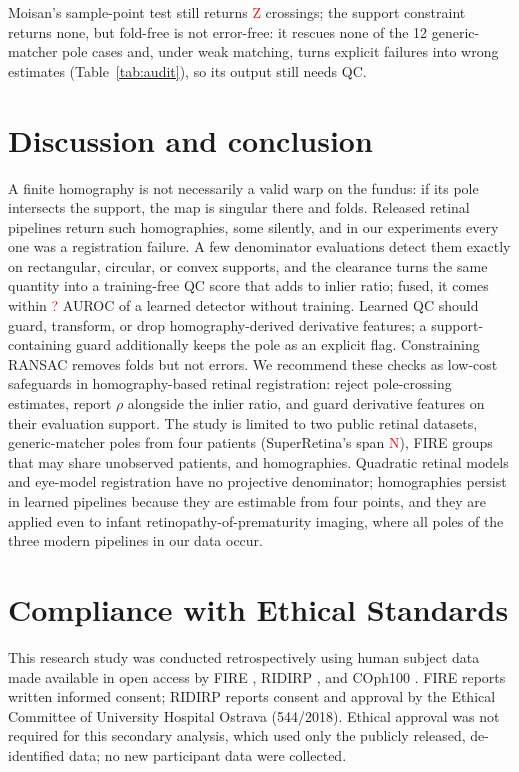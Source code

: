 \documentclass{article}
\newcommand{\pend}[1]{\textcolor{red}{#1}\typeout{PENDING VALUE: #1}}
\providecommand{\numMoisanLeft}{\pend{Z}}
\providecommand{\numSrPoleGroups}{\pend{N}}
\providecommand{\numFusedDetMargin}{\pend{?}}
\newcommand{\sr}{SuperRetina}
\begin{document}
Moisan's sample-point test \cite{moisan} still returns \numMoisanLeft{}
crossings; the support constraint returns none, but fold-free is not
error-free: it rescues none of the 12 generic-matcher pole cases and, under
weak matching, turns explicit failures into wrong estimates
(Table~\ref{tab:audit}), so its output still needs QC.

\section{Discussion and conclusion}
\label{sec:conclusion}

A finite homography is not necessarily a valid warp on the fundus: if its
pole intersects the support, the map is singular there and folds. Released
retinal pipelines return such homographies, some silently, and in our
experiments every one was a registration failure. A few denominator
evaluations detect them exactly on rectangular, circular, or convex supports,
and the clearance turns the same quantity into a training-free QC score that
adds to inlier ratio; fused, it comes within \numFusedDetMargin{} AUROC of a
learned detector without training. Learned QC should guard, transform, or
drop homography-derived derivative features; a support-containing guard
additionally keeps the pole as an explicit flag. Constraining RANSAC removes
folds but not errors. We recommend these checks as low-cost safeguards in
homography-based retinal registration: reject pole-crossing estimates, report
$\rho$ alongside the inlier ratio, and guard derivative features on their
evaluation support. The study is limited to two
public retinal datasets, generic-matcher poles from four patients
(\sr{}'s span \numSrPoleGroups), FIRE groups that may share unobserved
patients, and homographies. Quadratic retinal models \cite{can,gdbicp} and
eye-model registration \cite{rempe} have no projective denominator;
homographies persist in learned pipelines because they are estimable from
four points, and they are applied even to infant retinopathy-of-prematurity
imaging, where all poles of the three modern pipelines in our data occur.

\section{Compliance with Ethical Standards}
\label{sec:ethics}

This research study was conducted retrospectively using human subject data
made available in open access by FIRE \cite{fire}, RIDIRP \cite{ridirp}, and
COph100 \cite{coph}. FIRE reports written informed consent; RIDIRP reports
consent and approval by the Ethical Committee of University Hospital Ostrava
(544/2018). Ethical approval was not required for this secondary analysis,
which used only the publicly released, de-identified data; no new participant
data were collected.
\end{document}
